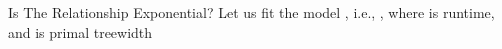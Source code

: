 \documentclass{beamer}
\begin{document}
\begin{frame}{Is The Relationship Exponential?}
  Let us fit the model , i.e.,
  , where  is
  \alert{runtime}, and  is \alert{primal treewidth}
  \begin{overprint}
  \end{overprint}
\end{frame}


\end{document}
